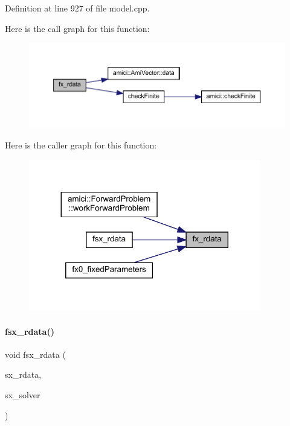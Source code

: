 Definition at line 927 of file model.\+cpp.

Here is the call graph for this function\+:
\nopagebreak
\begin{figure}[H]
\begin{center}
\leavevmode
\includegraphics[width=350pt]{classamici_1_1_model_a335850c2d4843d99cb03bb6101cf282d_cgraph}
\end{center}
\end{figure}
Here is the caller graph for this function\+:
\nopagebreak
\begin{figure}[H]
\begin{center}
\leavevmode
\includegraphics[width=287pt]{classamici_1_1_model_a335850c2d4843d99cb03bb6101cf282d_icgraph}
\end{center}
\end{figure}
\mbox{\label{classamici_1_1_model_aa19d5feeb75bc472ce6244790ebf765b}} 
\paragraph{\texorpdfstring{fsx\_rdata()}{fsx\_rdata()}\hspace{0.1cm}{\footnotesize\ttfamily [1/2]}}
{\footnotesize\ttfamily void fsx\+\_\+rdata (\begin{DoxyParamCaption}\item[{\mbox{\hyperlink{classamici_1_1_ami_vector_array}{Ami\+Vector\+Array}} $\ast$}]{sx\+\_\+rdata,  }\item[{const \mbox{\hyperlink{classamici_1_1_ami_vector_array}{Ami\+Vector\+Array}} $\ast$}]{sx\+\_\+solver }\end{DoxyParamCaption})}


